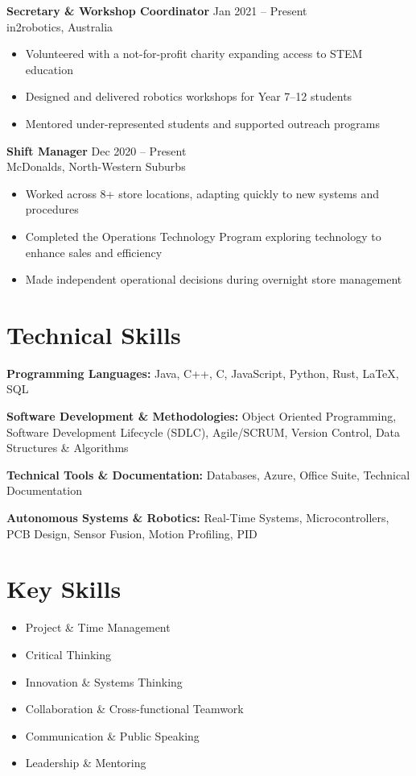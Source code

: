 \documentclass[11pt]{article}
\begin{document}
\textbf{Secretary \& Workshop Coordinator} \hfill Jan 2021 -- Present\\
in2robotics, Australia
\begin{itemize}
\item Volunteered with a not-for-profit charity expanding access to STEM education
\item Designed and delivered robotics workshops for Year 7–12 students
\item Mentored under-represented students and supported outreach programs
\end{itemize}

\textbf{Shift Manager} \hfill Dec 2020 -- Present\\
McDonalds, North-Western Suburbs
\begin{itemize}
\item Worked across 8+ store locations, adapting quickly to new systems and procedures
\item Completed the Operations Technology Program exploring technology to enhance sales and efficiency
\item Made independent operational decisions during overnight store management
\end{itemize}

\section*{Technical Skills}

\textbf{Programming Languages:} Java, C++, C, JavaScript, Python, Rust, LaTeX, SQL

\textbf{Software Development \& Methodologies:} Object Oriented Programming, Software Development Lifecycle (SDLC), Agile/SCRUM, Version Control, Data Structures \& Algorithms

\textbf{Technical Tools \& Documentation:} Databases, Azure, Office Suite, Technical Documentation

\textbf{Autonomous Systems \& Robotics:} Real-Time Systems, Microcontrollers, PCB Design, Sensor Fusion, Motion Profiling, PID

\section*{Key Skills}

\begin{itemize}
\item Project \& Time Management
\item Critical Thinking
\item Innovation \& Systems Thinking
\item Collaboration \& Cross-functional Teamwork
\item Communication \& Public Speaking
\item Leadership \& Mentoring
\end{itemize}
\end{document}
